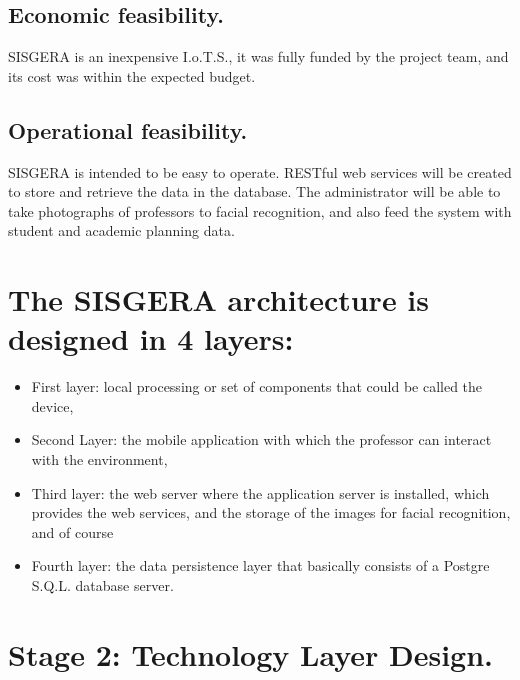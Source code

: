 \documentclass[]{scrartcl}
\begin{document}
	\subsection*{Economic feasibility.}
	SISGERA is an inexpensive I.o.T.S., it was fully funded by the project team, and its cost was within the expected budget.
	
	\subsection*{Operational feasibility.}
	SISGERA is intended to be easy to operate. RESTful web services will be created to store and retrieve the data in the database. The administrator will be able to take photographs of professors to facial recognition, and also feed the system with student and academic planning data.

\section*{The SISGERA architecture is designed in 4 layers:}

\begin{itemize}
	\item First layer: local processing or set of components that could be called the device,
	\item Second Layer: the mobile application with which the professor can interact with the environment,
	\item Third layer: the web server where the application server is installed, which provides the web services, and the storage of the images for facial recognition, and of course
	\item Fourth layer: the data persistence layer that basically consists of a Postgre S.Q.L. database server.
\end{itemize} 

\section*{Stage 2: Technology Layer Design.}
\end{document}
